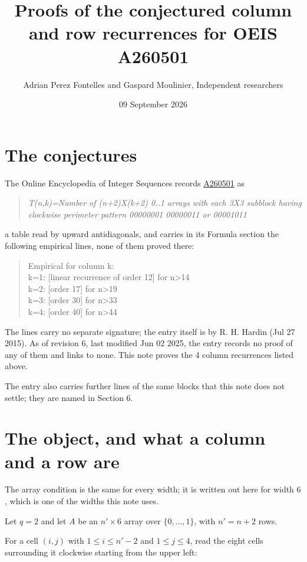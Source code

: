 \documentclass[11pt]{article}
\title{Proofs of the conjectured column and row recurrences for OEIS A260501}
\author{Adrian Perez Fontelles and Gaspard Moulinier, Independent researchers}
\date{09 September 2026}
\theoremstyle{definition}
\begin{document}
\maketitle
\section{The conjectures}

The Online Encyclopedia of Integer Sequences records \href{https://oeis.org/A260501}{A260501} as

\begin{quote}\itshape T(n,k)=Number of (n+2)X(k+2) 0..1 arrays with each 3X3 subblock having clockwise perimeter pattern 00000001 00000011 or 00001011\end{quote}

a table read by upward antidiagonals, and carries in its Formula section the following empirical lines, none of them proved there:

\begin{quote}\ttfamily Empirical for column k:\\
k=1: [linear recurrence of order 12] for n>14\\k=2: [order 17] for n>19\\k=3: [order 30] for n>33\\k=4: [order 40] for n>44\end{quote}

The lines carry no separate signature; the entry itself is by R. H. Hardin (Jul 27 2015). As of revision 6, last modified Jun 02 2025, the entry records no proof of any of them and links to none. This note proves the 4 column recurrences listed above.

The entry also carries further lines of the same blocks that this note does not settle; they are named in Section 6.

\section{The object, and what a column and a row are}

The array condition is the same for every width; it is written out here for width $6$, which is one of the widths this note uses.

Let $q = 2$ and let $A$ be an $n' \times 6$ array over $\{0,\dots,1\}$, with $n' = n + 2$ rows.

For a cell $(i,j)$ with $1 \le i \le n'-2$ and $1 \le j \le 4$, read the eight cells surrounding it clockwise starting from the upper left:
\end{document}
